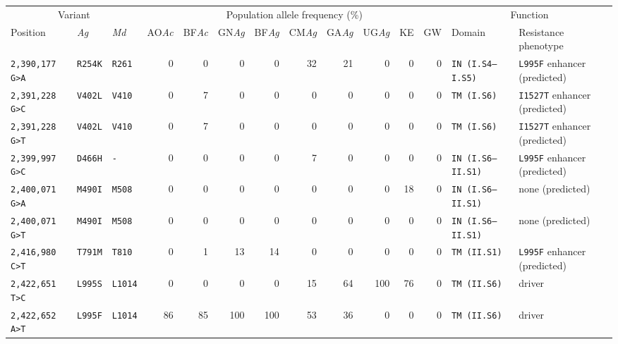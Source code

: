 
\begin{tabular}{lllrrrrrrrrrll}
\toprule
\multicolumn{3}{c}{Variant} &
\multicolumn{9}{c}{Population allele frequency (\%)} &
\multicolumn{2}{c}{Function} \\
\cmidrule(r){1-3}
\cmidrule(r){4-12}
\cmidrule(r){13-14}
Position\tnote{1} & 
\emph{Ag}\tnote{2} & 
\emph{Md}\tnote{3} & 
AO\emph{Ac} & 
BF\emph{Ac} & 
GN\emph{Ag} & 
BF\emph{Ag} & 
CM\emph{Ag} & 
GA\emph{Ag} & 
UG\emph{Ag} & 
KE & 
GW & 
Domain\tnote{4} & 
Resistance phenotype\tnote{5} \\
\midrule

\texttt{2,390,177 G>A} & \texttt{R254K} & \texttt{R261} & 0 & 0 & 0 & 0 & 32 & 21 & 0 & 0 & 0 & \texttt{IN (I.S4--I.S5)} & \texttt{L995F} enhancer (predicted) \\

\texttt{2,391,228 G>C} & \texttt{V402L} & \texttt{V410} & 0 & 7 & 0 & 0 & 0 & 0 & 0 & 0 & 0 & \texttt{TM (I.S6)} & \texttt{I1527T} enhancer (predicted) \\

\texttt{2,391,228 G>T} & \texttt{V402L} & \texttt{V410} & 0 & 7 & 0 & 0 & 0 & 0 & 0 & 0 & 0 & \texttt{TM (I.S6)} & \texttt{I1527T} enhancer (predicted) \\

\texttt{2,399,997 G>C} & \texttt{D466H} & \texttt{-} & 0 & 0 & 0 & 0 & 7 & 0 & 0 & 0 & 0 & \texttt{IN (I.S6--II.S1)} & \texttt{L995F} enhancer (predicted) \\

\texttt{2,400,071 G>A} & \texttt{M490I} & \texttt{M508} & 0 & 0 & 0 & 0 & 0 & 0 & 0 & 18 & 0 & \texttt{IN (I.S6--II.S1)} & none (predicted) \\

\texttt{2,400,071 G>T} & \texttt{M490I} & \texttt{M508} & 0 & 0 & 0 & 0 & 0 & 0 & 0 & 0 & 0 & \texttt{IN (I.S6--II.S1)} & none (predicted) \\

\texttt{2,416,980 C>T} & \texttt{T791M} & \texttt{T810} & 0 & 1 & 13 & 14 & 0 & 0 & 0 & 0 & 0 & \texttt{TM (II.S1)} & \texttt{L995F} enhancer (predicted) \\

\texttt{2,422,651 T>C} & \texttt{L995S} & \texttt{L1014} & 0 & 0 & 0 & 0 & 15 & 64 & 100 & 76 & 0 & \texttt{TM (II.S6)} & driver \\

\texttt{2,422,652 A>T} & \texttt{L995F} & \texttt{L1014} & 86 & 85 & 100 & 100 & 53 & 36 & 0 & 0 & 0 & \texttt{TM (II.S6)} & driver \\


\end{tabular}
